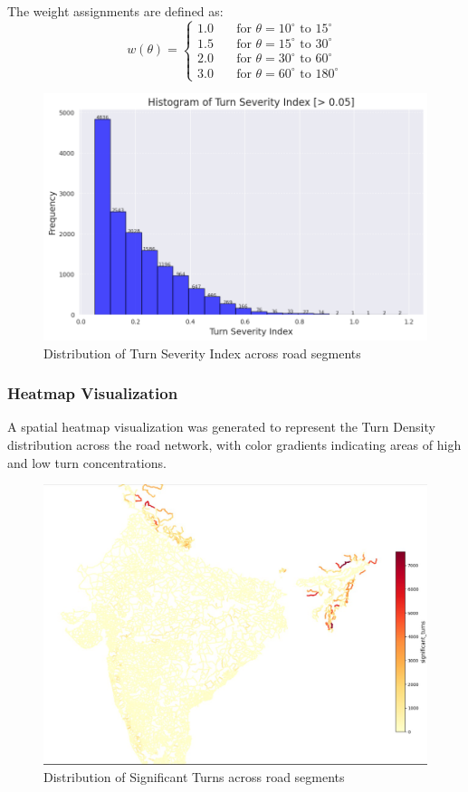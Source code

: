 \documentclass[sigplan,screen]{acmart}
\begin{document}
The weight assignments are defined as:
\begin{equation}
    w(\theta) = \begin{cases}
    1.0 & \quad \text{for } \theta = 10^\circ \text{ to } 15^\circ \\
    1.5 & \quad \text{for } \theta = 15^\circ \text{ to } 30^\circ \\
    2.0 & \quad \text{for } \theta = 30^\circ \text{ to } 60^\circ \\
    3.0 & \quad \text{for } \theta = 60^\circ \text{ to } 180^\circ
    \end{cases}
\end{equation}

\begin{figure}[h]
    \centering
    \includegraphics[width=0.8\linewidth]{images/turn_index_dist.png}
    \caption{Distribution of Turn Severity Index across road segments}
    \label{fig:turn_index}
\end{figure}

\subsubsection{Heatmap Visualization}
A spatial heatmap visualization was generated to represent the Turn Density distribution across the road network, with color gradients indicating areas of high and low turn concentrations.

\begin{figure}[h]
    \centering
    \includegraphics[width=0.8\linewidth]{images/significant_turns_heatmap.png}
    \caption{Distribution of Significant Turns across road segments}
    \label{fig:significant_turns}
\end{figure}
\end{document}
